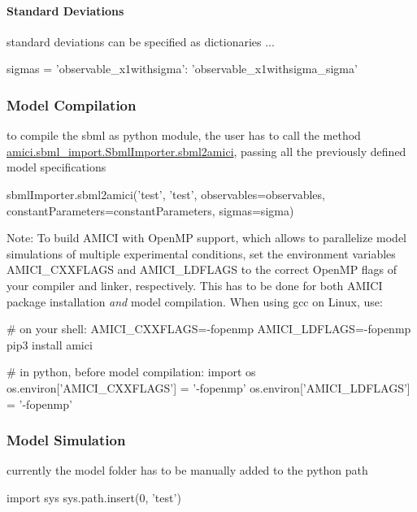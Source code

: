 \paragraph*{Standard Deviations}

standard deviations can be specified as dictionaries ... \begin{DoxyVerb}sigmas = {'observable_x1withsigma': 'observable_x1withsigma_sigma'}
\end{DoxyVerb}


\subsubsection*{Model Compilation}

to compile the sbml as python module, the user has to call the method {\ttfamily \mbox{\hyperlink{classamici_1_1sbml__import_1_1_sbml_importer_ae5cdd2444bac89e61e6f717f7736acb6}{amici.\+sbml\+\_\+import.\+Sbml\+Importer.\+sbml2amici}}}, passing all the previously defined model specifications \begin{DoxyVerb}sbmlImporter.sbml2amici('test', 'test', 
                        observables=observables,
                        constantParameters=constantParameters,
                        sigmas=sigma)
\end{DoxyVerb}


Note\+: To build A\+M\+I\+CI with Open\+MP support, which allows to parallelize model simulations of multiple experimental conditions, set the environment variables {\ttfamily A\+M\+I\+C\+I\+\_\+\+C\+X\+X\+F\+L\+A\+GS} and {\ttfamily A\+M\+I\+C\+I\+\_\+\+L\+D\+F\+L\+A\+GS} to the correct Open\+MP flags of your compiler and linker, respectively. This has to be done for both A\+M\+I\+CI package installation {\itshape and} model compilation. When using {\ttfamily gcc} on Linux, use\+: \begin{DoxyVerb}# on your shell:
AMICI_CXXFLAGS=-fopenmp AMICI_LDFLAGS=-fopenmp pip3 install amici

# in python, before model compilation:
import os
os.environ['AMICI_CXXFLAGS'] = '-fopenmp'
os.environ['AMICI_LDFLAGS'] = '-fopenmp'
\end{DoxyVerb}


\subsubsection*{Model Simulation}

currently the model folder has to be manually added to the python path \begin{DoxyVerb}import sys
sys.path.insert(0, 'test')
\end{DoxyVerb}


